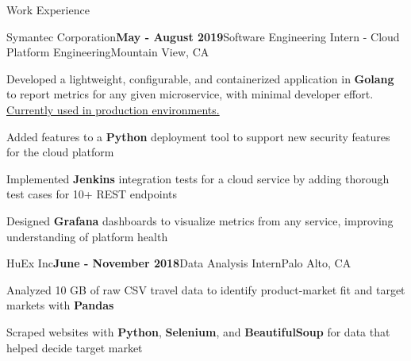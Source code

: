 \documentclass[mm,centered]{resume} %
\begin{document}
\begin{rSection}{Work Experience}

	\begin{rSubsection}{Symantec Corporation}{\textbf{May - August 2019}}{Software Engineering Intern - Cloud Platform Engineering}{Mountain View, CA}
		\item Developed a lightweight, configurable, and containerized application in \textbf{Golang} to report metrics for any given microservice, with minimal developer effort. \underline{Currently used in production environments.}
		\item Added features to a \textbf{Python} deployment tool to support new security features for the cloud platform
		\item Implemented \textbf{Jenkins} integration tests for a cloud service by adding thorough test cases for 10+ REST endpoints
		\item Designed \textbf{Grafana} dashboards to visualize metrics from any service, improving understanding of platform health
	\end{rSubsection}

	\begin{rSubsection}{HuEx Inc}{\textbf{June - November 2018}}{Data Analysis Intern}{Palo Alto, CA}
		\item Analyzed 10 GB of raw CSV travel data to identify product-market fit and target markets with \textbf{Pandas}
		\item Scraped websites with \textbf{Python}, \textbf{Selenium}, and \textbf{BeautifulSoup} for data that helped decide target market
	\end{rSubsection}

\end{rSection}
\end{document}
